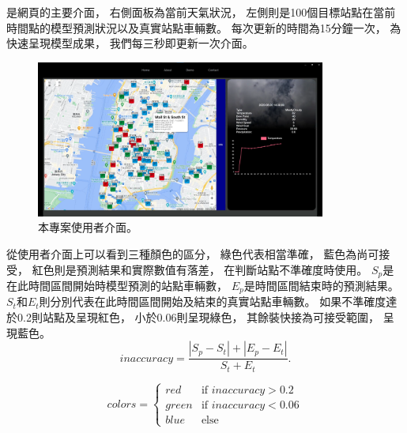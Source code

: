 \documentclass[a4paper,12pt]{extarticle}
\begin{document}
            是網頁的主要介面，
            右側面板為當前天氣狀況，
            左側則是100個目標站點在當前時間點的模型預測狀況以及真實站點車輛數。
            每次更新的時間為15分鐘一次，
            為快速呈現模型成果，
            我們每三秒即更新一次介面。
            \begin{figure}[htb]
                \centering
                \includegraphics[width=0.85\textwidth]{nstc_adjust_image.png}
                \caption{
                    本專案使用者介面。
                }
                \label{fig:web-view}
            \end{figure}
            從使用者介面上可以看到三種顏色的區分，
            綠色代表相當準確，
            藍色為尚可接受，
            紅色則是預測結果和實際數值有落差，
            在判斷站點不準確度時使用。
            $S_p$是在此時間區間開始時模型預測的站點車輛數，
            $E_p$是時間區間結束時的預測結果。
            $S_t$和$E_t$則分別代表在此時間區間開始及結束的真實站點車輛數。
            如果不準確度達於0.2則站點及呈現紅色，
            小於0.06則呈現綠色，
            其餘裝快接為可接受範圍，
            呈現藍色。
            \begin{equation}
                \label{acc_equ}
                \text{$inaccuracy$} = \frac{|S_p-S_t|+|E_p-E_t|}{S_t+E_t}.
            \end{equation}

            \[
            colors =
            \begin{cases}
                red & \text{if $inaccuracy>0.2$} \\
                green & \text{if $inaccuracy<0.06$} \\
                blue & \text{else} 
            \end{cases}
            \]
\end{document}
